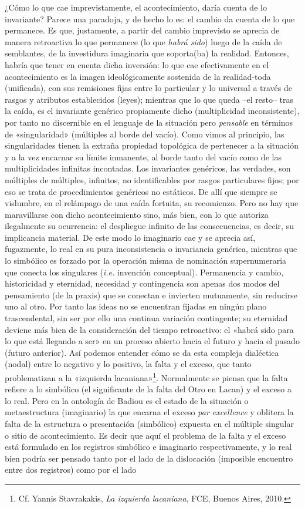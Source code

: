 ¿Cómo lo que cae imprevistamente, el acontecimiento, daría cuenta de lo invariante? Parece una paradoja, y de hecho lo es: el cambio da cuenta de lo que permanece. Es que, justamente, a partir del cambio imprevisto se aprecia de manera retroactiva lo que permanece (lo que \emph{habrá sido}) luego de la caída de semblantes, de la investidura imaginaria que soporta(ba) la realidad. Entonces, habría que tener en cuenta dicha inversión: lo que cae efectivamente en el acontecimiento es la imagen ideológicamente sostenida de la realidad-toda (unificada), con sus remisiones fijas entre lo particular y lo universal a través de rasgos y atributos establecidos (leyes); mientras que lo que queda --el resto-- tras la caída, es el invariante genérico propiamente dicho (multiplicidad inconsistente), por tanto no discernible en el lenguaje de la situación pero \emph{pensable} en términos de «singularidad» (múltiples al borde del vacío). Como vimos al principio, las singularidades tienen la extraña propiedad topológica de pertenecer a la situación y a la vez encarnar su límite inmanente, al borde tanto del vacío como de las multiplicidades infinitas incontadas. Los invariantes genéricos, las verdades, son múltiples de múltiples, infinitos, no identificables por rasgos particulares fijos; por eso se trata de procedimientos genéricos no estáticos. De allí que siempre se vislumbre, en el relámpago de una caída fortuita, su recomienzo. Pero no hay que maravillarse con dicho acontecimiento sino, más bien, con lo que autoriza ilegalmente su ocurrencia: el despliegue infinito de las consecuencias, es decir, su implicancia material. De este modo lo imaginario cae y se aprecia así, fugazmente, lo real en su pura inconsistencia o invariancia genérica, mientras que lo simbólico es forzado por la operación misma de nominación supernumeraria que conecta los singulares (\emph{i.e.} invención conceptual). Permanencia y cambio, historicidad y eternidad, necesidad y contingencia son apenas dos modos del pensamiento (de la praxis) que se conectan e invierten mutuamente, sin reducirse uno al otro. Por tanto las ideas no se encuentran fijadas en ningún plano trascendental, sin ser por ello una continua variación contingente; su eternidad deviene más bien de la consideración del tiempo retroactivo: el «habrá sido para lo que está llegando a ser» en un proceso abierto hacia el futuro y hacia el pasado (futuro anterior). Así podemos entender cómo se da esta compleja dialéctica (nodal) entre lo negativo y lo positivo, la falta y el exceso, que tanto problematizan a la «izquierda lacaniana»\footnote{Cf. Yannis Stavrakakis, \emph{La izquierda lacaniana}, FCE, Buenos Aires, 2010.}. Normalmente se piensa que la falta refiere a lo simbólico (el significante de la falta del Otro en Lacan) y el exceso a lo real. Pero en la ontología de Badiou es el estado de la situación o metaestructura (imaginario) la que encarna el exceso \emph{par excellence} y oblitera la falta de la estructura o presentación (simbólico) expuesta en el múltiple singular o sitio de acontecimiento. Es decir que aquí el problema de la falta y el exceso está formulado en los registros simbólico e imaginario respectivamente, y lo real bien podría ser pensado tanto por el lado de la dislocación (imposible encuentro entre dos registros) como por el lado 